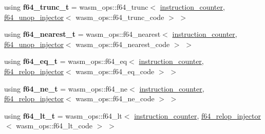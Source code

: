 \begin{DoxyCompactItemize}
using {\bfseries f64\+\_\+trunc\+\_\+t} = wasm\+\_\+ops\+::f64\+\_\+trunc$<$ \mbox{\hyperlink{structaacio_1_1chain_1_1wasm__injections_1_1instruction__counter}{instruction\+\_\+counter}}, \mbox{\hyperlink{structaacio_1_1chain_1_1wasm__injections_1_1f64__unop__injector}{f64\+\_\+unop\+\_\+injector}}$<$ wasm\+\_\+ops\+::f64\+\_\+trunc\+\_\+code $>$ $>$
\item 
\mbox{\label{structaacio_1_1chain_1_1wasm__injections_1_1pre__op__injectors_aca555138c516c6f1ba70887088a4b221}} 
using {\bfseries f64\+\_\+nearest\+\_\+t} = wasm\+\_\+ops\+::f64\+\_\+nearest$<$ \mbox{\hyperlink{structaacio_1_1chain_1_1wasm__injections_1_1instruction__counter}{instruction\+\_\+counter}}, \mbox{\hyperlink{structaacio_1_1chain_1_1wasm__injections_1_1f64__unop__injector}{f64\+\_\+unop\+\_\+injector}}$<$ wasm\+\_\+ops\+::f64\+\_\+nearest\+\_\+code $>$ $>$
\item 
\mbox{\label{structaacio_1_1chain_1_1wasm__injections_1_1pre__op__injectors_adc5d2e5a761dbb0e4b1b6ff48d0381e5}} 
using {\bfseries f64\+\_\+eq\+\_\+t} = wasm\+\_\+ops\+::f64\+\_\+eq$<$ \mbox{\hyperlink{structaacio_1_1chain_1_1wasm__injections_1_1instruction__counter}{instruction\+\_\+counter}}, \mbox{\hyperlink{structaacio_1_1chain_1_1wasm__injections_1_1f64__relop__injector}{f64\+\_\+relop\+\_\+injector}}$<$ wasm\+\_\+ops\+::f64\+\_\+eq\+\_\+code $>$ $>$
\item 
\mbox{\label{structaacio_1_1chain_1_1wasm__injections_1_1pre__op__injectors_a13210ffc78906af8254b14eb263c5c87}} 
using {\bfseries f64\+\_\+ne\+\_\+t} = wasm\+\_\+ops\+::f64\+\_\+ne$<$ \mbox{\hyperlink{structaacio_1_1chain_1_1wasm__injections_1_1instruction__counter}{instruction\+\_\+counter}}, \mbox{\hyperlink{structaacio_1_1chain_1_1wasm__injections_1_1f64__relop__injector}{f64\+\_\+relop\+\_\+injector}}$<$ wasm\+\_\+ops\+::f64\+\_\+ne\+\_\+code $>$ $>$
\item 
\mbox{\label{structaacio_1_1chain_1_1wasm__injections_1_1pre__op__injectors_aa637ff7587820027c39c3899194d8193}} 
using {\bfseries f64\+\_\+lt\+\_\+t} = wasm\+\_\+ops\+::f64\+\_\+lt$<$ \mbox{\hyperlink{structaacio_1_1chain_1_1wasm__injections_1_1instruction__counter}{instruction\+\_\+counter}}, \mbox{\hyperlink{structaacio_1_1chain_1_1wasm__injections_1_1f64__relop__injector}{f64\+\_\+relop\+\_\+injector}}$<$ wasm\+\_\+ops\+::f64\+\_\+lt\+\_\+code $>$ $>$

\end{DoxyCompactItemize}

